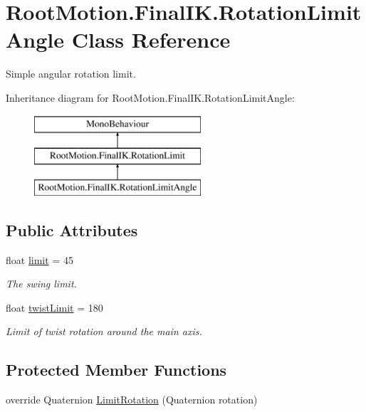 \hypertarget{class_root_motion_1_1_final_i_k_1_1_rotation_limit_angle}{}\section{Root\+Motion.\+Final\+I\+K.\+Rotation\+Limit\+Angle Class Reference}
\label{class_root_motion_1_1_final_i_k_1_1_rotation_limit_angle}


Simple angular rotation limit.  


Inheritance diagram for Root\+Motion.\+Final\+I\+K.\+Rotation\+Limit\+Angle\+:\begin{figure}[H]
\begin{center}
\leavevmode
\includegraphics[height=3.000000cm]{class_root_motion_1_1_final_i_k_1_1_rotation_limit_angle}
\end{center}
\end{figure}
\subsection*{Public Attributes}
\begin{DoxyCompactItemize}
\item 
float \mbox{\hyperlink{class_root_motion_1_1_final_i_k_1_1_rotation_limit_angle_a408919481a55317dabbb6a439254f12e}{limit}} = 45
\begin{DoxyCompactList}\small\item\em The swing limit. \end{DoxyCompactList}\item 
float \mbox{\hyperlink{class_root_motion_1_1_final_i_k_1_1_rotation_limit_angle_a7d32cd3594187cae31d86845fbd4d3f8}{twist\+Limit}} = 180
\begin{DoxyCompactList}\small\item\em Limit of twist rotation around the main axis. \end{DoxyCompactList}\end{DoxyCompactItemize}
\subsection*{Protected Member Functions}
\begin{DoxyCompactItemize}
\item 
override Quaternion \mbox{\hyperlink{class_root_motion_1_1_final_i_k_1_1_rotation_limit_angle_af94125b5f84e83387721d12d5f9c50aa}{Limit\+Rotation}} (Quaternion rotation)
\end{DoxyCompactItemize}
